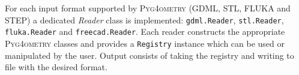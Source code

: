 \documentclass[preprint,12pt]{elsarticle}
\newcommand{\PYGEOMETRY}{\textsc{Pyg4ometry}}
\begin{document}
%


For each input format supported by \PYGEOMETRY{}  (GDML, STL, FLUKA and STEP) a dedicated \emph{Reader} class is implemented: \verb|gdml.Reader|,
\verb|stl.Reader|, \verb|fluka.Reader| and \verb|freecad.Reader|. Each reader constructs the appropriate \PYGEOMETRY{} classes and provides a \verb|Registry| instance which
can be used or manipulated by the user.
Output consists of taking the registry and writing to file with the desired format.
\end{document}
